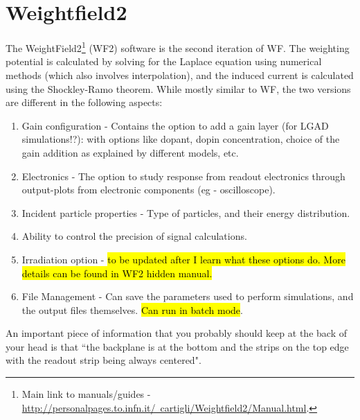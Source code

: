\documentclass[11pt]{article}
\newcommand{\hlyellow}[1]{{\sethlcolor{yellow}\hl{#1}}}
\begin{document}
\section{Weightfield2}
The WeightField2\footnote{Main link to manuals/guides - \href{http://personalpages.to.infn.it/~cartigli/Weightfield2/Manual.html}{http://personalpages.to.infn.it/~cartigli/Weightfield2/Manual.html}.} (WF2) software is the second iteration of WF. The weighting potential is calculated by solving for the Laplace equation using numerical methods (which also involves interpolation), and the induced current is calculated using the Shockley-Ramo theorem. While mostly similar to WF, the two versions are different in the following aspects:
\begin{enumerate}
    \item Gain configuration - Contains the option to add a gain layer (for LGAD simulations!?): with options like dopant, dopin concentration, choice of the gain addition as explained by different models, etc.
    \item Electronics - The option to study response from readout electronics through output-plots from electronic components (eg - oscilloscope).
    \item Incident particle properties - Type of particles, and their energy distribution.
    \item Ability to control the precision of signal calculations.
    \item Irradiation option - \hlyellow{to be updated after I learn what these options do. More details can be found in WF2 hidden manual.}
    \item File Management - Can save the parameters used to perform simulations, and the output files themselves. \hlyellow{Can run in batch mode}.
\end{enumerate}
An important piece of information that you probably should keep at the back of your head is that ``the backplane is at the bottom and the strips on the top edge with the readout strip being always centered".
\end{document}
